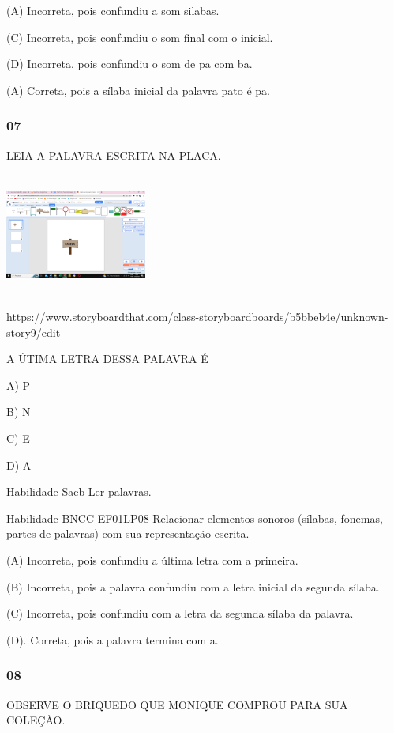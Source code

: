 \begin{escola}
\protect\hypertarget{_heading=h.19c6y18}{}{}(A) Incorreta, pois
confundiu a som silabas.

(C) Incorreta, pois confundiu o som final com o inicial.

(D) Incorreta, pois confundiu o som de pa com ba.

(A) Correta, pois a sílaba inicial da palavra pato é pa.

\subsubsection{07}\label{section-47}

LEIA A PALAVRA ESCRITA NA PLACA.

\includegraphics[width=1.83704in,height=1.58560in]{media/image216.png}

https://www.storyboardthat.com/class-storyboardboards/b5bbeb4e/unknown-story9/edit

A ÚTIMA LETRA DESSA PALAVRA É

A) P

B) N

C) E

D) A

Habilidade Saeb Ler palavras.

Habilidade BNCC EF01LP08 Relacionar elementos sonoros (sílabas, fonemas,
partes de palavras) com sua representação escrita.

(A) Incorreta, pois confundiu a última letra com a primeira.

(B) Incorreta, pois a palavra confundiu com a letra inicial da segunda
sílaba.

(C) Incorreta, pois confundiu com a letra da segunda sílaba da palavra.

(D). Correta, pois a palavra termina com a.

\subsubsection{08}\label{section-48}

OBSERVE O BRIQUEDO QUE MONIQUE COMPROU PARA SUA COLEÇÃO.


\end{escola}
